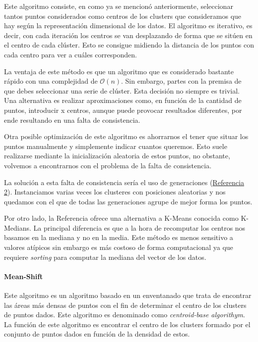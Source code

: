 \documentclass[conference,a4paper]{IEEEtran}
\begin{document}
Este algoritmo consiste, en como ya se mencionó anteriormente, seleccionar tantos puntos considerados como centros de los clusters que consideramos que hay según la representación dimensional de los datos. El algoritmo es iterativo, es decir, con cada iteración los centros se van desplazando de forma que se sitúen en el centro de cada clúster. Esto se consigue midiendo la distancia de los puntos con cada centro para ver a cuáles corresponden.

La ventaja de este método es que un algoritmo que es considerado bastante rápido con una complejidad de $\mathcal{O}(n)$. Sin embargo, partes con la premisa de que debes seleccionar una serie de clúster. Esta decisión no siempre es trivial. Una alternativa es realizar aproximaciones como, en función de la cantidad de puntos, introducir x centros, aunque puede provocar resultados diferentes, por ende resultando en una falta de consistencia.

Otra posible optimización de este algoritmo es ahorrarnos el tener que situar los puntos manualmente y simplemente indicar cuantos queremos. Esto suele realizarse mediante la inicialización aleatoria de estos puntos, no obstante, volvemos a encontrarnos con el problema de la falta de consistencia.

La solución a esta falta de consistencia sería el uso de generaciones (\hyperref[bib:clustering]{Referencia 2}). Instanciamos varias veces los clusteres con posiciones aleatorias y nos quedamos con el que de todas las generaciones agrupe de mejor forma los puntos.

Por otro lado, la Referencia ofrece una alternativa a K-Means conocida como K-Medians. La principal diferencia es que a la hora de recomputar los centros nos basamos en la mediana y no en la media. Este método es menos sensitivo a valores atípicos sin embargo es más costoso de forma computacional ya que requiere \textit{sorting} para computar la mediana del vector de los datos.\\

\paragraph{\textbf{Mean-Shift}}

Este algoritmo es un algoritmo basado en un enventanado que trata de encontrar las áreas más densas de puntos con el fin de determinar el centro de los clusters de puntos dados. Este algoritmo es denominado como \textit{centroid-base algorithym}. La función de este algoritmo es encontrar el centro de los clusters formado por el conjunto de puntos dados en función de la densidad de estos.
\end{document}
